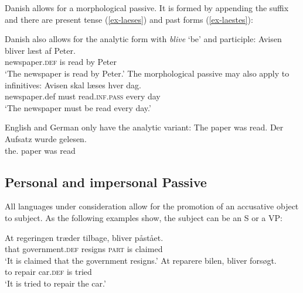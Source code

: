 Danish allows for a morphological passive. It is formed by appending the  suffix and there
are present tense (\ref{ex-laeses}) and past forms (\ref{ex-laestes}):
\eal
{}
\zl

Danish also allows for the analytic form with \emph{blive} `be' and participle: 
\ea
\gll Avisen              bliver læst af Peter.\\
     newspaper.\textsc{def} is     read by Peter\\
\glt `The newspaper is read by Peter.'
\z
The morphological passive may also apply to infinitives:
\ea
\gll Avisen skal læses hver dag.\\
     newspaper.def must read.\textsc{inf}.\textsc{pass} every day\\
\glt `The newspaper must be read every day.'
\z


English and German only have the analytic variant:
\eal
\ex The paper was read.
\ex 
\gll Der Aufsatz wurde gelesen.\\
     the.\NOM{} paper was read\\\german
\zl    





\subsection{Personal and impersonal Passive}

All languages under consideration allow for the promotion of an accusative object to subject. As the
following examples show, the subject can be an S or a VP:

\eal
\ex
\gll At regeringen træder tilbage, bliver påstået.\\
     that government.\textsc{def} resigns \textsc{part} is claimed\\
\glt `It is claimed that the government resigns.'
\ex
\gll At reparere bilen, bliver forsøgt.\\
     to repair car.\textsc{def} is tried\\
\glt `It is tried to repair the car.'
\zl

